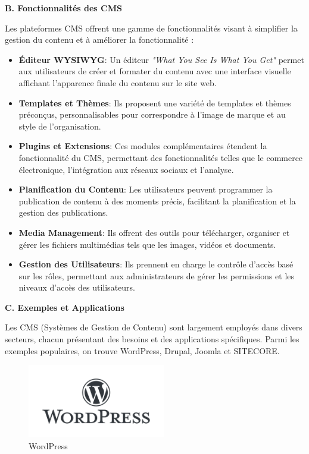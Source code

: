 \textbf{B. Fonctionnalités des CMS}


Les plateformes CMS offrent une gamme de fonctionnalités visant à simplifier la gestion du contenu et à améliorer la fonctionnalité :


\begin{itemize}
\item \textbf{Éditeur WYSIWYG}: Un éditeur \textit{"What You See Is What You Get"} permet aux utilisateurs de créer et formater du contenu avec une interface visuelle affichant l'apparence finale du contenu sur le site web.

\item \textbf{Templates et Thèmes}: Ils proposent une variété de templates et thèmes préconçus, personnalisables pour correspondre à l'image de marque et au style de l'organisation.

\item \textbf{Plugins et Extensions}: Ces modules complémentaires étendent la fonctionnalité du CMS, permettant des fonctionnalités telles que le commerce électronique, l'intégration aux réseaux sociaux et l'analyse.

\item \textbf{Planification du Contenu}: Les utilisateurs peuvent programmer la publication de contenu à des moments précis, facilitant la planification et la gestion des publications.
\item \textbf{Media Management}: Ils offrent des outils pour télécharger, organiser et gérer les fichiers multimédias tels que les images, vidéos et documents.

\item \textbf{Gestion des Utilisateurs}: Ils prennent en charge le contrôle d'accès basé sur les rôles, permettant aux administrateurs de gérer les permissions et les niveaux d'accès des utilisateurs.
\end{itemize}

\textbf{C. Exemples et Applications}

Les CMS (Systèmes de Gestion de Contenu) sont largement employés dans divers secteurs, chacun présentant des besoins et des applications spécifiques. Parmi les exemples populaires, on trouve WordPress, Drupal, Joomla et SITECORE.
\begin{figure}[H] 
    \centering
    \includegraphics[width=6cm]{Figures/WordPress.png}
    \caption{WordPress}
    \label{fig:my_label} %
\end{figure}

